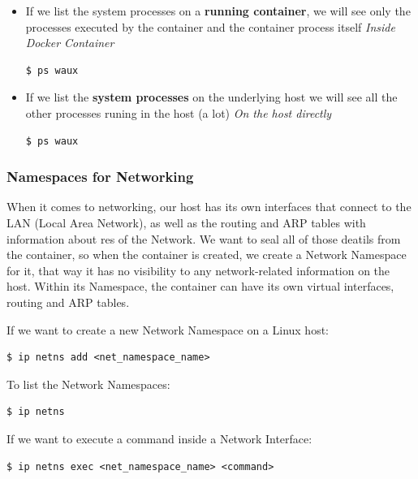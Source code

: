 \documentclass{article}
\newenvironment{codetemplate}[1][]{%
  \mybasecolorbox[#1]
  \itshape
}{%
  \endmybasecolorbox
}
\begin{document}
\begin{itemize}
    \item If we list the system processes on a \textbf{running container}, we will see only the processes executed by the container and the container process itself
\begin{codetemplate}{Inside Docker Container}
\begin{verbatim}
$ ps waux
\end{verbatim}
\end{codetemplate}

    \item If we list the \textbf{system processes} on the underlying host we will see all the other processes runing in the host (a lot)
\begin{codetemplate}{On the host directly}
\begin{verbatim}
$ ps waux
\end{verbatim}
\end{codetemplate}
\end{itemize}

\subsubsection{Namespaces for Networking}

When it comes to networking, our host has its own interfaces that connect to the LAN (Local Area Network), as well as the routing and ARP tables with information about res of the Network. We want to seal all of those deatils from the container, so when the container is created, we create a Network Namespace for it, that way it has no visibility to any network-related information on the host. Within its Namespace, the container can have its own virtual interfaces, routing and ARP tables.

If we want to create a new Network Namespace on a Linux host:
\begin{codetemplate}{}
\begin{verbatim}
$ ip netns add <net_namespace_name>
\end{verbatim}
\end{codetemplate}

To list the Network Namespaces:
\begin{codetemplate}{}
\begin{verbatim}
$ ip netns
\end{verbatim}
\end{codetemplate}

If we want to execute a command inside a Network Interface:
\begin{codetemplate}{}
\begin{verbatim}
$ ip netns exec <net_namespace_name> <command>
\end{verbatim}
\end{codetemplate}
\end{document}
